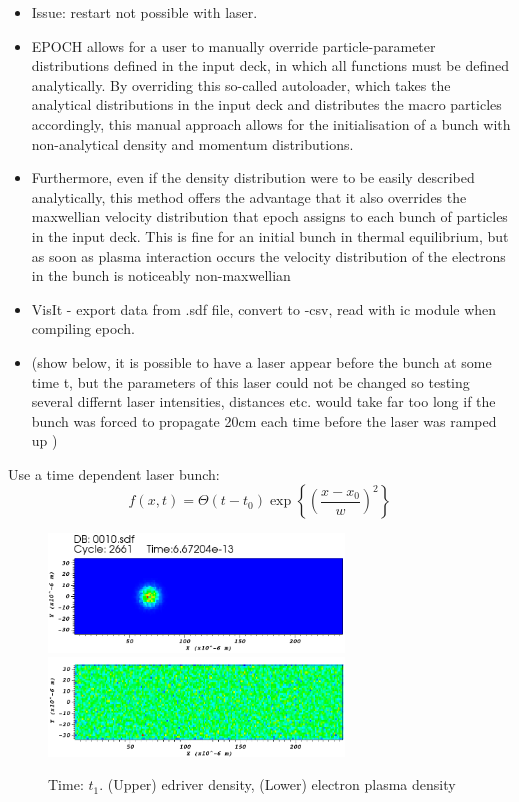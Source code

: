 \documentclass[%
onecolumn, notitlepage,
 amsmath,amssymb,
 aps,
]{article}
\begin{document}
\begin{itemize}
\item Issue: restart not possible with laser. 
\item EPOCH allows for a user to manually override particle-parameter distributions defined in the input deck, in which all functions must be defined analytically. By overriding this so-called autoloader, which takes the analytical distributions in the input deck and distributes the macro particles accordingly, this manual approach allows for the initialisation of a bunch with non-analytical density and momentum distributions. 
\item Furthermore, even if the density distribution were to be easily described analytically, this method offers the advantage that it also overrides the maxwellian velocity distribution that epoch assigns to each bunch of particles in the input deck. This is fine for an initial bunch in thermal equilibrium, but as soon as plasma interaction occurs the velocity distribution of the electrons in the bunch is noticeably non-maxwellian
\item VisIt - export data from .sdf file, convert to -csv, read with ic module when compiling epoch.
\item (show below, it is possible to have a laser appear before the bunch at some time t, but the parameters of this laser could not be changed so testing several differnt laser intensities, distances etc. would take far too long if the bunch was forced to propagate 20cm each time before the laser was ramped up )
\end{itemize}
Use a time dependent laser bunch:
\begin{equation}
f(x,t)=\Theta\left(t-t_0\right)\exp\left\{\left(\frac{x-x_0}{w}\right)^2\right\}
\end{equation}
\begin{figure}[!ht]
\centering
\includegraphics[width=0.7\textwidth]{buncht1copy.png}\\
\includegraphics[width=0.7\textwidth]{lasert1copy.png}
\caption{Time: $t_1$. (Upper) edriver density, (Lower) electron plasma density}
\vspace{-10pt}
\end{figure}
\end{document}
